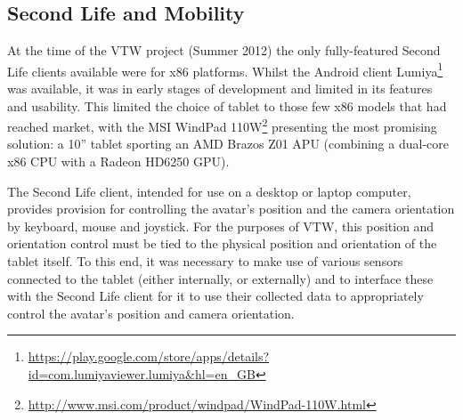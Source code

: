 


\subsection{Second Life and Mobility}

\label{SecondLifeMobility}

\newcommand{\LumiyaFootnote}{\footnote{\url{https://play.google.com/store/apps/details?id=com.lumiyaviewer.lumiya&hl=en_GB}}}

\newcommand{\WindpadFootnote}{\footnote{\url{http://www.msi.com/product/windpad/WindPad-110W.html}}}


At the time of the VTW project (Summer 2012) the only fully-featured Second Life clients available were for x86 platforms. Whilst the Android client Lumiya\LumiyaFootnote{} was available, it was in early stages of development and limited in its features and usability. This limited the choice of tablet to those few x86 models that had reached market, with the MSI WindPad 110W\WindpadFootnote{} presenting the most promising solution: a 10'' tablet sporting an AMD Brazos Z01 APU (combining a dual-core x86 CPU with a Radeon HD6250 GPU).

The Second Life client, intended for use on a desktop or laptop computer, provides provision for controlling the avatar's position and the camera orientation by keyboard, mouse and joystick. For the purposes of VTW, this position and orientation control must be tied to the physical position and orientation of the tablet itself. To this end, it was necessary to make use of various sensors connected to the tablet (either internally, or externally) and to interface these with the Second Life client for it to use their collected data to appropriately control the avatar's position and camera orientation.


